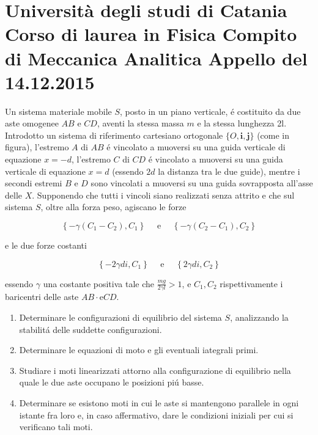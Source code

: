 \documentclass[10pt]{article}
\begin{document}
\section{Università degli studi di Catania
Corso di laurea in Fisica
Compito di Meccanica Analitica Appello del 14.12.2015}
Un sistema materiale mobile \(S\), posto in un piano verticale, é costituito da due aste omogenee \(A B\) e \(C D\), aventi la stessa massa \(m\) e la stessa lunghezza 2l. Introdotto un sistema di riferimento cartesiano ortogonale \(\{O, \mathbf{i}, \mathbf{j}\}\) (come in figura), l'estremo \(A\) di \(A B\) é vincolato a muoversi su una guida verticale di equazione \(x=-d\), l'estremo \(C\) di \(C D\) é vincolato a muoversi su una guida verticale di equazione \(x=d\) (essendo \(2 d\) la distanza tra le due guide), mentre i secondi estremi \(B\) e \(D\) sono vincolati a muoversi su una guida sovrapposta all'asse delle \(X\). Supponendo che tutti i vincoli siano realizzati senza attrito e che sul sistema \(S\), oltre alla forza peso, agiscano le forze

\[
\left\{-\gamma\left(C_{1}-C_{2}\right), C_{1}\right\} \quad \text { e } \quad\left\{-\gamma\left(C_{2}-C_{1}\right), C_{2}\right\}
\]

e le due forze costanti

\[
\left\{-2 \gamma d i, C_{1}\right\} \quad \text { e } \quad\left\{2 \gamma d i, C_{2}\right\}
\]

essendo \(\gamma\) una costante positiva tale che \(\frac{m g}{2 \gamma l}>1\), e \(C_{1}, C_{2}\) rispettivamente i baricentri delle aste \(A B \cdot \mathrm{e} C D\).

\begin{enumerate}
  \item Determinare le configurazioni di equilibrio del sistema \(S\), analizzando la stabilitá delle suddette configurazioni.

  \item Determinare le equazioni di moto e gli eventuali iategrali primi.

  \item Studiare i moti linearizzati attorno alla configurazione di equilibrio nella quale le due aste occupano le posizioni piú basse.

  \item Determinare se esistono moti in cui le aste si mantengono parallele in ogni istante fra loro e, in caso affermativo, dare le condizioni iniziali per cui si verificano tali moti.

\end{enumerate}
\end{document}
